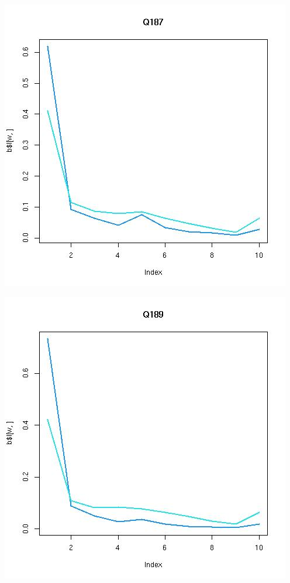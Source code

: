 \documentclass{amsart}
\begin{document}
\includegraphics[scale=0.6]{fitQ187.jpeg}

\includegraphics[scale=0.6]{fitQ189.jpeg}
\end{document}
